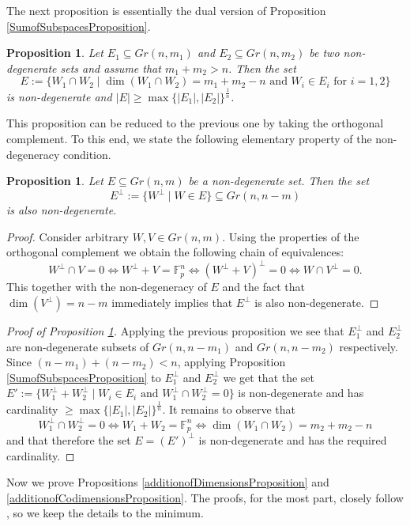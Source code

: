 \documentclass{amsart}
\newtheorem{proposition}[theorem]{Proposition}
\newcommand{\F}{\mathbb F}
\begin{document}
The next proposition is essentially the dual version of Proposition \ref{SumofSubspacesProposition}.

\begin{proposition}\label{CapofSubspacesProposition}
    Let $E_1 \subseteq Gr(n, m_1)$ and $E_2 \subseteq Gr(n, m_2)$ be two non-degenerate sets and assume that $m_1 + m_2 > n$. Then the set $$E := \{W_1 \cap W_2 \mid  \dim(W_1 \cap W_2) = m_1 + m_2 - n \text{ and } W_i \in E_i \text{ for } i = 1, 2\}$$ is non-degenerate and $|E| \geq \max\{|E_1|, |E_2|\}^\frac{1}{n}$.
\end{proposition}
This proposition can be reduced to the previous one by taking the orthogonal complement. To this end, we state the following elementary property of the non-degeneracy condition.
\begin{proposition}
    Let $E \subseteq Gr(n, m)$ be a non-degenerate set. Then the set $$E^\bot := \{W^\bot \mid W \in E\} \subseteq Gr(n, n - m)$$ is also non-degenerate.
\end{proposition}

\begin{proof}
    Consider arbitrary $W, V \in Gr(n, m)$. Using the properties of the orthogonal complement we obtain the following chain of equivalences:
    $$W^\bot \cap V = 0 \Leftrightarrow W^\bot + V = \F_p^n \Leftrightarrow (W^\bot + V)^\bot = 0 \Leftrightarrow W \cap V^\bot = 0.$$
    This together with the non-degeneracy of $E$ and the fact that $\dim(V^\bot) = n - m$ immediately implies that $E^\bot$ is also non-degenerate.
\end{proof}

\begin{proof}[Proof of Proposition \ref{CapofSubspacesProposition}]
    Applying the previous proposition we see that $E_1^\bot$ and $E_2^\bot$ are non-degenerate subsets of $Gr(n, n - m_1)$ and $Gr(n, n - m_2)$ respectively. Since $(n - m_1) + (n - m_2) < n$, applying Proposition \ref{SumofSubspacesProposition} to $E_1^\bot$ and $E_2^\bot$ we get that the set $E':=\{W_1^\bot + W_2^\bot \mid W_i \in E_i \text{ and } W_1^\bot \cap W_2^\bot = 0\}$ is non-degenerate and has cardinality $\geq \max\{|E_1|, |E_2|\}^\frac{1}{n}$. It remains to observe that $$W_1^\bot \cap W_2^\bot = 0 \Leftrightarrow W_1 + W_2 = \F_p^n \Leftrightarrow \dim(W_1 \cap W_2) = m_2 + m_2 - n$$ and that therefore the set $E = (E')^\bot$ is non-degenerate and has the required cardinality.  
\end{proof}

Now we prove Propositions \ref{additionofDimensionsProposition} and \ref{additionofCodimensionsProposition}. The proofs, for the most part, closely follow \cite{He18}, so we keep the details to the minimum.
\end{document}
